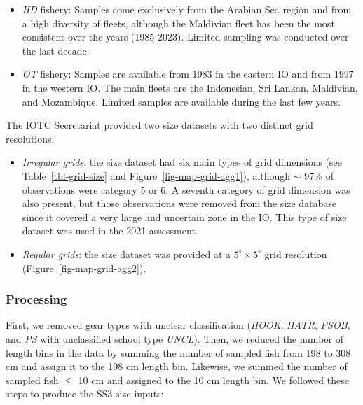 \documentclass[
]{scrartcl}
\providecommand{\tightlist}{%
  \setlength{\itemsep}{0pt}\setlength{\parskip}{0pt}}\usepackage{longtable,booktabs,array}
\begin{document}
\begin{itemize}
  (France, Mayotte) and Maldives. In the eastern IO, size data come from
  Indonesia (1985-1990 and after 2019) and Sri Lanka (1994-2018) fleets.
\item
  \emph{HD} fishery: Samples come exclusively from the Arabian Sea
  region and from a high diversity of fleets, although the Maldivian
  fleet has been the most consistent over the years (1985-2023). Limited
  sampling was conducted over the last decade.
\item
  \emph{OT} fishery: Samples are available from 1983 in the eastern IO
  and from 1997 in the western IO. The main fleets are the Indonesian,
  Sri Lankan, Maldivian, and Mozambique. Limited samples are available
  during the last few years.
\end{itemize}

The IOTC Secretariat provided two size datasets with two distinct grid
resolutions:

\begin{itemize}
\tightlist
\item
  \emph{Irregular grids}: the size dataset had six main types of grid
  dimensions (see Table~\ref{tbl-grid-size} and
  Figure~\ref{fig-map-grid-agg1}), although \(\sim\) 97\% of
  observations were category 5 or 6. A seventh category of grid
  dimension was also present, but those observations were removed from
  the size database since it covered a very large and uncertain zone in
  the IO. This type of size dataset was used in the 2021 assessment.
\item
  \emph{Regular grids}: the size dataset was provided at a
  \(5^\circ\times 5^\circ\) grid resolution
  (Figure~\ref{fig-map-grid-agg2}).
\end{itemize}

\subsubsection{Processing}\label{processing}

First, we removed gear types with unclear classification (\emph{HOOK},
\emph{HATR}, \emph{PSOB}, and \emph{PS} with unclassified school type
\emph{UNCL}). Then, we reduced the number of length bins in the data by
summing the number of sampled fish from 198 to 308 cm and assign it to
the 198 cm length bin. Likewise, we summed the number of sampled fish
\(\leq\) 10 cm and assigned to the 10 cm length bin. We followed these
steps to produce the SS3 size inputs:
\end{document}
